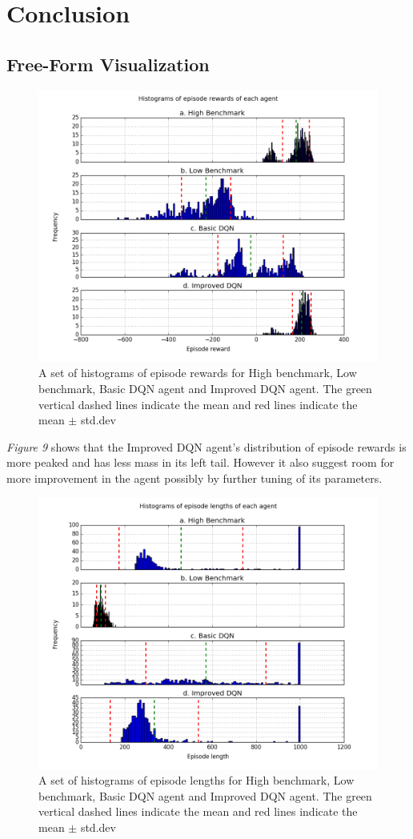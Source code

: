 \documentclass{article}
\begin{document}
\section{Conclusion}
\subsection*{Free-Form Visualization}
\begin{figure}[H]
	\caption{A set of histograms of episode rewards for High benchmark, Low benchmark, Basic DQN agent and Improved DQN agent. The green vertical dashed lines indicate the mean and red lines indicate the mean $\pm$ std.dev}
	\centering
	\includegraphics[width=13cm,trim={0 0 0 0},clip]{img/ffviz_er}
\end{figure}
\textit{Figure 9} shows that the Improved DQN agent's distribution of episode rewards is more peaked and has less mass in its left tail. However it also suggest room for more improvement in the agent possibly by further tuning of its parameters.
\begin{figure}[H]
	\caption{A set of histograms of episode lengths for High benchmark, Low benchmark, Basic DQN agent and Improved DQN agent. The green vertical dashed lines indicate the mean and red lines indicate the mean $\pm$ std.dev}
	\centering
	\includegraphics[width=13cm,trim={0 0 0 0},clip]{img/ffviz_en}
\end{figure}
\end{document}
